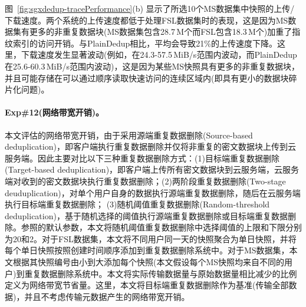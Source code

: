 图~\ref{fig:sgxdedup-tracePerformance}(b) 显示了所选10个MS数据集中快照的上传/下载速度。两个系统的上传速度都低于处理FSL数据集时的表现，这是因为MS数据集有更多的非重复数据块(MS数据集包含28.7\,M个而FSL包含18.3\,M个)加重了指纹索引的访问开销。与PlainDedup相比，\sysnameS 平均会导致21\%的上传速度下降。这里，下载速度发生显著波动(例如，\sysnameS 在24.3-57.5\,MiB/s范围内波动，而PlainDedup在25.6-60.3\,MiB/s范围内波动)，这是因为某些MS快照具有更多的非重复数据块，并且可能存储在可以通过顺序读取快速访问的连续区域内(即具有更小的数据块碎片化问题)。

\paragraph*{Exp\#12(网络带宽开销)。} 本文评估\sysnameS 的网络带宽开销，由于\sysnameS 采用源端重复数据删除(Source-based deduplication)，即客户端执行重复数据删除并仅将非重复的密文数据块上传到云服务端。因此主要对比以下三种重复数据删除方式：(1)目标端重复数据删除(Target-based deduplication)，即客户端上传所有密文数据块到云服务端，云服务端对收到的密文数据块执行重复数据删除；(2)两阶段重复数据删除(Two-stage deuduplication)，对单个用户自身的数据执行源端重复数据删除，随后在云服务端执行目标端重复数据删除； (3)随机阈值重复数据删除(Random-threshold deduplication)，基于随机选择的阈值执行源端重复数据删除或目标端重复数据删除。参照的默认参数，本文将随机阈值重复数据删除中选择阈值的上限和下限分别为20和2。对于FSL数据集，本文将不同用户同一天的快照聚合为单日快照，并将每个单日快照按照创建时间顺序添加到重复数据删除系统中。对于MS数据集，本文根据其快照编号由小到大添加每个快照(本文假设每个MS快照均来自不同的用户)到重复数据删除系统中。本文将实际传输数据量与原始数据量相比减少的比例定义为网络带宽节省量。这里，本文将目标端重复数据删除作为基准(传输全部数据)，并且不考虑传输元数据产生的网络带宽开销。


